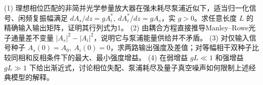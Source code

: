 (1) 理想相位匹配的非简并光学参量放大器在强未耗尽泵浦近似下，适当归一化信号、闲频复振幅满足 \(dA_s/dz=gA_i^*,\ dA_i^*/dz=gA_s\)，实 \(g>0\)。求任意长度 \(L\) 的精确输入输出矩阵，证明其行列式为1。
(2) 由耦合方程直接推导Manley–Rowe光子通量差不变量 \(|A_s|^2-|A_i|^2\)，说明它与泵浦能量供给并不矛盾。
(3) 对仅输入信号种子 \(A_s(0)=A_0,\ A_i(0)=0\)，求两路输出强度及差值；对等幅相干双种子比较同相和反相条件下的最大、最小强度增益。
(4) 在弱增益 \(gL\ll1\) 和强增益 \(gL\gg1\) 下给出渐近式，讨论相位失配、泵浦耗尽及量子真空噪声如何限制上述经典模型的解释。
